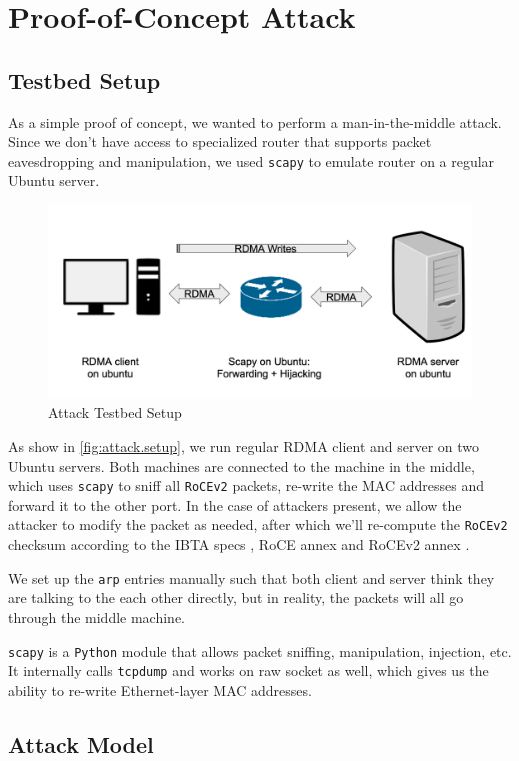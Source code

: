\section{Proof-of-Concept Attack}

\subsection{Testbed Setup}
\label{sec:attack.setup}

As a simple proof of concept, we wanted to perform a man-in-the-middle attack.
Since we don't have access to specialized router that supports packet eavesdropping
and manipulation, we used \texttt{scapy} to emulate router on a regular Ubuntu server.

\begin{figure}[h]
    \centering
    \includegraphics[width=0.5\textwidth - 5pt]{fig/attack_setup}
    \caption{Attack Testbed Setup}
    \label{fig:attack.setup}
\end{figure}

As show in \autoref{fig:attack.setup}, we run regular RDMA client and server
on two Ubuntu servers. Both machines are connected to the machine in the middle,
which uses \texttt{scapy} to sniff all \texttt{RoCEv2} packets, re-write the MAC
addresses and forward it to the other port. In the case of attackers present, we
allow the attacker to modify the packet as needed, after which we'll re-compute
the \texttt{RoCEv2} checksum according to the IBTA specs \cite{infiniband:iba.spec.vol1.v1.3},
RoCE annex \cite{infiniband:iba.spec.annex.roce} and RoCEv2 annex \cite{infiniband:iba.spec.annex.rocev2}.

We set up the \texttt{arp} entries manually such that both client and server think
they are talking to the each other directly, but in reality, the packets will all
go through the middle machine.

\texttt{scapy} is a \texttt{Python} module that allows packet sniffing, manipulation, injection, etc.
It internally calls \texttt{tcpdump} and works on raw socket as well, which gives us the ability to
re-write Ethernet-layer MAC addresses.

\subsection{Attack Model}
\label{sec:attack.model}


